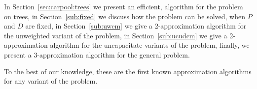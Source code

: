 In Section~\ref{sec:carpool:trees} we present an efficient,
algorithm for the problem on trees, 
in Section~\ref{sub:fixed} we discuss how the problem can be solved,
when $P$ and $D$ are fixed,
in Section~\ref{sub:uwcm} we give a 2-approximation algorithm for the
unweighted variant of the problem,
in Section~\ref{sub:ucudcm} we give a 2-approximation algorithm
for the uncapacitate variants of the problem, 
finally, we present a 3-approximation
algorithm for the general problem.

To the best of our knowledge, 
these are the first known approximation algorithms for any variant of the problem.
